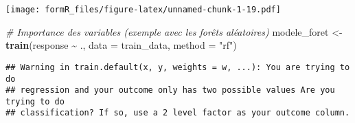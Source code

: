 \documentclass[
]{article}
\newenvironment{Shaded}{\begin{snugshade}}{\end{snugshade}}
\newcommand{\AttributeTok}[1]{\textcolor[rgb]{0.13,0.29,0.53}{#1}}
\newcommand{\CommentTok}[1]{\textcolor[rgb]{0.56,0.35,0.01}{\textit{#1}}}
\newcommand{\FunctionTok}[1]{\textcolor[rgb]{0.13,0.29,0.53}{\textbf{#1}}}
\newcommand{\NormalTok}[1]{#1}
\newcommand{\OtherTok}[1]{\textcolor[rgb]{0.56,0.35,0.01}{#1}}
\newcommand{\SpecialCharTok}[1]{\textcolor[rgb]{0.81,0.36,0.00}{\textbf{#1}}}
\newcommand{\StringTok}[1]{\textcolor[rgb]{0.31,0.60,0.02}{#1}}
\begin{document}
\texttt{[image: formR\_files/figure-latex/unnamed-chunk-1-19.pdf]}

\begin{Shaded}
\begin{Highlighting}[]
\CommentTok{\# Importance des variables (exemple avec les forêts aléatoires)}
\NormalTok{modele\_foret }\OtherTok{\textless{}{-}} \FunctionTok{train}\NormalTok{(response }\SpecialCharTok{\textasciitilde{}}\NormalTok{ ., }\AttributeTok{data =}\NormalTok{ train\_data, }\AttributeTok{method =} \StringTok{"rf"}\NormalTok{)}
\end{Highlighting}
\end{Shaded}

\begin{verbatim}
## Warning in train.default(x, y, weights = w, ...): You are trying to do
## regression and your outcome only has two possible values Are you trying to do
## classification? If so, use a 2 level factor as your outcome column.
\end{verbatim}
\end{document}
